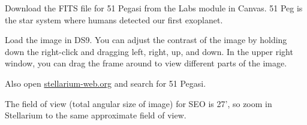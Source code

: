 
\begin{steps}
	\item Download the FITS file for 51 Pegasi from the Labs module in Canvas. 51 Peg is the star system where humans detected our first exoplanet.


	\item Load the image in DS9. You can adjust the contrast of the image by holding down the right-click and dragging left, right, up, and down. In the upper right window, you can drag the frame around to view different parts of the image.



	\item Also open \url{stellarium-web.org} and search for 51 Pegasi.


	\item The field of view (total angular size of image) for SEO is 27', so zoom in Stellarium to the same approximate field of view.


\end{steps}
